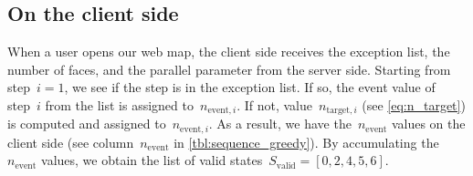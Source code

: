 \documentclass[]{interact}
\begin{document}



\subsection{On the client side}
\label{sec:communicate_client}


When a user opens our web map,
the client side receives the exception list, the number of faces, 
and the parallel parameter from the server side.
Starting from step~$i=1$,
we see if the step is in the exception list.
If so, the event value of step~$i$ from the list 
is assigned to~$n_{\mathrm{event},i}$.
If not, value~$n_{\mathrm{target},i}$ (see \eq\ref{eq:n_target})
is computed and assigned to~$n_{\mathrm{event},i}$.
As a result, we have the~$n_\mathrm{event}$ values on the client side
(see column~$n_\mathrm{event}$ in \tabl\ref{tbl:sequence_greedy}).
By accumulating the~$n_\mathrm{event}$ values,
we obtain the list of valid states~$S_\mathrm{valid} = [0, 2, 4, 5, 6]$.
\end{document}
